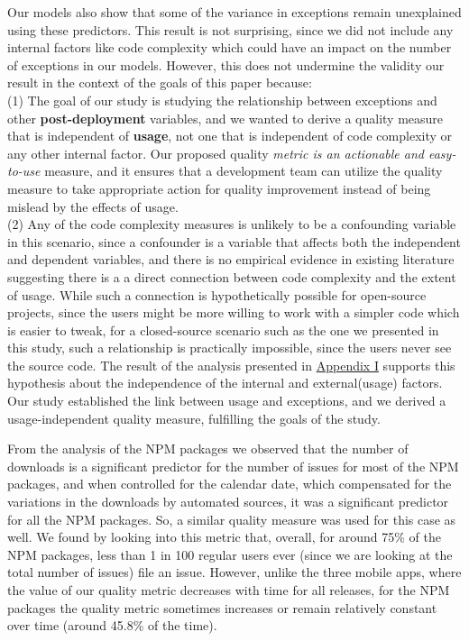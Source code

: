 \documentclass[smallcondensed]{svjour3}     %
\begin{document}
Our models  also show that some of the variance in exceptions remain unexplained using these predictors.
This result is not surprising, since we did not include any internal factors
like code complexity which could have an impact on the number of exceptions in our models.
However, this does not undermine the validity our result in the context of the goals of this 
paper because: \\(1) The goal of our study is studying the relationship 
between exceptions and other \textbf{post-deployment} variables, and we wanted to
derive a quality measure that is independent of \textbf{usage}, not one that is independent of
code complexity or any other internal factor. Our proposed quality \emph{metric is an actionable and easy-to-use} measure, and it ensures that a development team can utilize the quality measure to take appropriate action for quality improvement instead of being mislead by the effects of usage.\\
(2) Any of the code complexity measures is unlikely to be a confounding variable in this scenario,
since a confounder is a variable that affects both the independent and dependent variables, and 
there is no empirical evidence in existing literature suggesting there is a a direct connection between 
code complexity and the extent of usage. While such a connection is hypothetically possible for open-source
projects, since the users might be more willing to work with a simpler code which is easier to tweak, for a closed-source scenario such as the one we presented in this study, such a relationship is practically impossible, since the users never see the source code. The result of the analysis presented in \hyperref[app1]{Appendix I} supports this hypothesis about the independence of the internal and external(usage) factors.
Our study established the link between usage and exceptions, and we derived a 
usage-independent quality measure, fulfilling the goals of the study.

From the analysis of the NPM packages we observed that the number of downloads is a significant predictor for the number of issues for  most of the NPM packages, and when controlled for the calendar date, which compensated for the variations in the downloads by automated sources, it was a significant predictor for all the NPM packages. So, a similar quality measure was used for this case as well. 
We found by looking into this metric that, overall, for around 75\% of the NPM packages, less than 1 in 100 regular users ever (since we are looking at the total number of issues) file an issue.
However, unlike the three mobile apps, where the value of our quality metric decreases with time for all releases, for the NPM packages the quality metric sometimes increases or remain relatively constant over time (around 45.8\% of the time). 
\end{document}
